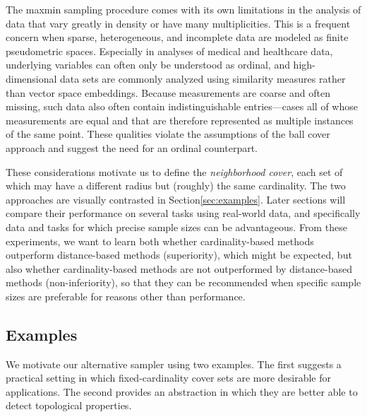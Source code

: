 \documentclass{article}
\begin{document}
The maxmin sampling procedure comes with its own limitations in the
analysis of data that vary greatly in density or have many
multiplicities. This is a frequent concern when sparse, heterogeneous,
and incomplete data are modeled as finite pseudometric spaces.
Especially in analyses of medical and healthcare data, underlying
variables can often only be understood as ordinal, and high-dimensional
data sets are commonly analyzed using similarity measures rather than
vector space embeddings. Because measurements are coarse and often
missing, such data also often contain indistinguishable entries---cases
all of whose measurements are equal and that are therefore represented
as multiple instances of the same point. These qualities violate the
assumptions of the ball cover approach and suggest the need for an
ordinal counterpart.

These considerations motivate us to define the \emph{neighborhood
cover}, each set of which may have a different radius but (roughly) the
same cardinality. The two approaches are visually contrasted in
Section\nbs\ref{sec:examples}. Later sections will compare their
performance on several tasks using real-world data, and specifically
data and tasks for which precise sample sizes can be advantageous. From
these experiments, we want to learn both whether cardinality-based
methods outperform distance-based methods (superiority), which might be
expected, but also whether cardinality-based methods are not
outperformed by distance-based methods (non-inferiority), so that they
can be recommended when specific sample sizes are preferable for reasons
other than performance.

\hypertarget{examples}{%
\subsection{Examples}\label{examples}}

\label{sec:examples}

We motivate our alternative sampler using two examples. The first
suggests a practical setting in which fixed-cardinality cover sets are
more desirable for applications. The second provides an abstraction in
which they are better able to detect topological properties.
\end{document}
